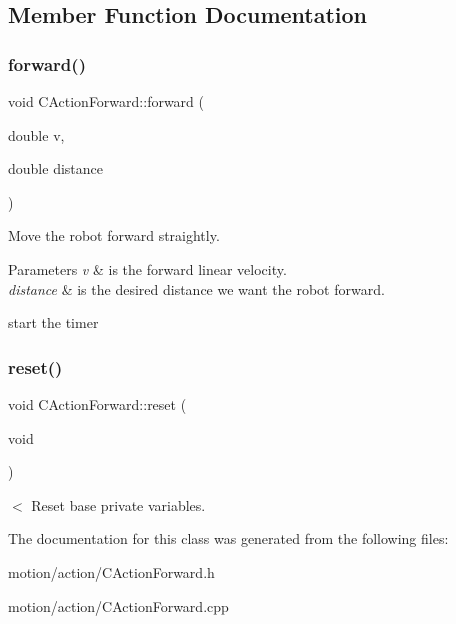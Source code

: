 \subsection{Member Function Documentation}
\mbox{\label{classmotion_1_1CActionForward_abc4d3b39f49514f9d3f64a92393aa6d2}} 
\subsubsection{\texorpdfstring{forward()}{forward()}}
{\footnotesize\ttfamily void C\+Action\+Forward\+::forward (\begin{DoxyParamCaption}\item[{double}]{v,  }\item[{double}]{distance }\end{DoxyParamCaption})}

Move the robot forward straightly. 
\begin{DoxyParams}{Parameters}
{\em v} & is the forward linear velocity. \\
\hline
{\em distance} & is the desired distance we want the robot forward. \\
\hline
\end{DoxyParams}
start the timer \mbox{\label{classmotion_1_1CActionForward_af7c72ffee0c2f41c8608259ef3268f23}} 
\subsubsection{\texorpdfstring{reset()}{reset()}}
{\footnotesize\ttfamily void C\+Action\+Forward\+::reset (\begin{DoxyParamCaption}\item[{void}]{ }\end{DoxyParamCaption})}

$<$ Reset base private variables. 

The documentation for this class was generated from the following files\+:\begin{DoxyCompactItemize}
\item 
motion/action/C\+Action\+Forward.\+h\item 
motion/action/C\+Action\+Forward.\+cpp\end{DoxyCompactItemize}
